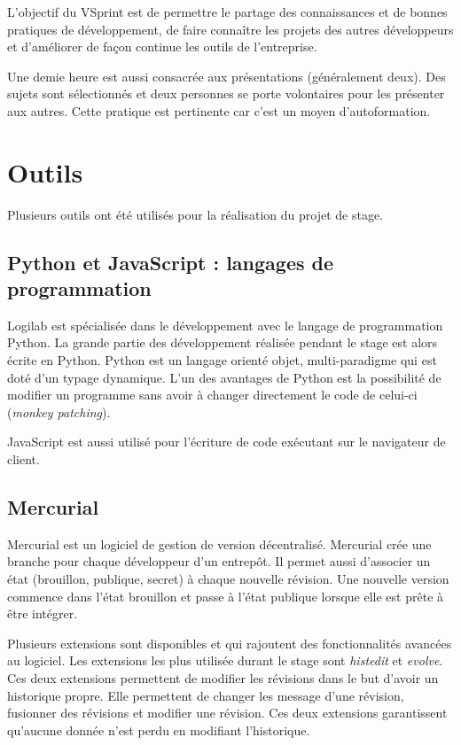 L'objectif du VSprint est de permettre le partage des connaissances et de
bonnes pratiques de développement, de faire connaître les projets des autres
développeurs et d'améliorer de façon continue les outils de l'entreprise. 

Une demie heure est aussi consacrée aux présentations (généralement deux). Des
sujets sont sélectionnés et deux personnes se porte volontaires pour les
présenter aux autres. Cette pratique est pertinente car c'est un moyen
d'autoformation.

\section{Outils} 
Plusieurs outils ont été utilisés pour la réalisation du projet de stage. 

\subsection{Python et JavaScript : langages de programmation} 
Logilab est spécialisée dans le développement avec le langage de programmation 
Python. La grande partie des développement réalisée pendant le stage est alors 
écrite en Python. Python est un langage orienté objet, multi-paradigme qui est 
doté d'un typage dynamique. L'un des avantages de Python est la possibilité de 
modifier un programme sans avoir à changer directement le code de celui-ci
(\textit{monkey patching}).

JavaScript est aussi utilisé pour l'écriture de code exécutant sur le
navigateur de client. 

\subsection{Mercurial} 
Mercurial est un logiciel de gestion de version décentralisé. Mercurial crée une 
branche pour chaque développeur d'un entrepôt. Il permet aussi d'associer un état 
(brouillon, publique, secret) à chaque nouvelle révision. Une nouvelle version 
commence dans l'état brouillon et passe à l'état publique lorsque elle est prête 
à être intégrer. 

Plusieurs extensions sont disponibles et qui rajoutent des fonctionnalités
avancées au logiciel. Les extensions les plus utilisée durant le stage sont
\textit{histedit} et \textit{evolve}. Ces deux extensions permettent de
modifier les révisions dans le but d'avoir un historique propre. Elle
permettent de changer les message d'une révision, fusionner des révisions et
modifier une révision. Ces deux extensions garantissent qu'aucune donnée n'est
perdu en modifiant l'historique. 

